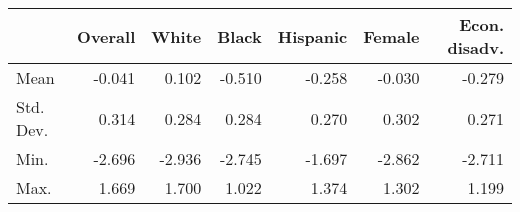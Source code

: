 
\begin{tabular}{lrrrrrr}
\toprule
  & Overall & White & Black & Hispanic & Female & Econ. disadv.\\
\midrule
Mean & -0.041 & 0.102 & -0.510 & -0.258 & -0.030 & -0.279\\
Std. Dev. & 0.314 & 0.284 & 0.284 & 0.270 & 0.302 & 0.271\\
Min. & -2.696 & -2.936 & -2.745 & -1.697 & -2.862 & -2.711\\
Max. & 1.669 & 1.700 & 1.022 & 1.374 & 1.302 & 1.199\\
\bottomrule
\end{tabular}
